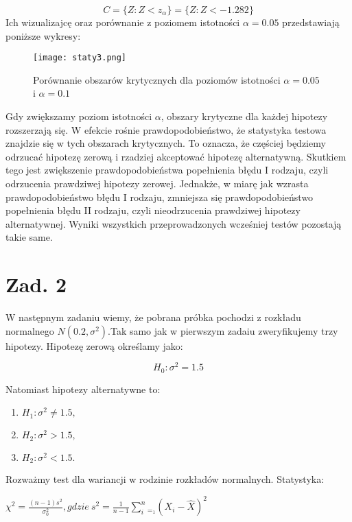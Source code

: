 \documentclass[12pt,letterpaper]{article}
\theoremstyle{definition}
\begin{document}
\[
C = \{Z : Z < z_{\alpha} \} = \{Z : Z < -1.282\}
\]
Ich wizualizajcę oraz porównanie z poziomem istotności $\alpha = 0.05$ przedstawiają poniższe wykresy:

\begin{figure}[H]
			\centering

				\centering
				\texttt{[image: staty3.png]}
				\caption{Porównanie obszarów krytycznych dla poziomów istotności $\alpha = 0.05$ i $\alpha = 0.1$}
				\label{fig:zdjecie1}
			\hfill
		\end{figure}

Gdy zwiększamy poziom istotności $\alpha$, obszary krytyczne dla każdej hipotezy rozszerzają się. W efekcie rośnie prawdopodobieństwo, że statystyka testowa znajdzie się w tych obszarach krytycznych. To oznacza, że częściej będziemy odrzucać hipotezę zerową i rzadziej akceptować hipotezę alternatywną. Skutkiem tego jest zwiększenie prawdopodobieństwa popełnienia błędu I rodzaju, czyli odrzucenia prawdziwej hipotezy zerowej. Jednakże, w miarę jak wzrasta prawdopodobieństwo błędu I rodzaju, zmniejsza się prawdopodobieństwo popełnienia błędu II rodzaju, czyli nieodrzucenia prawdziwej hipotezy alternatywnej. Wyniki wszystkich przeprowadzonych wcześniej testów pozostają takie same.

\section{Zad. 2}
W następnym zadaniu wiemy, że pobrana próbka pochodzi z rozkładu normalnego $N(0.2,\sigma^2)$.Tak samo jak w pierwszym zadaiu zweryfikujemy trzy hipotezy. Hipotezę zerową określamy jako:

\begin{equation}
    H_0: \sigma^2 = 1.5
\end{equation} 


Natomiast hipotezy alternatywne to:
\begin{enumerate}
    \centering
    \item $H_1: \sigma^2 \neq 1.5,$
    \item $H_2: \sigma^2 > 1.5,$
    \item $H_2: \sigma^2 < 1.5.$
\end{enumerate}

Rozważmy test dla wariancji w rodzinie rozkładów normalnych. Statystyka:
\begin{center}
    $\chi^2=\frac{(n-1)s^2}{\sigma^2_0}, gdzie \ s^2=\frac{1}{n-1}\sum^n_i_=_1 (X_i - \hat{X})^2$
\end{center}
\\
\end{document}
